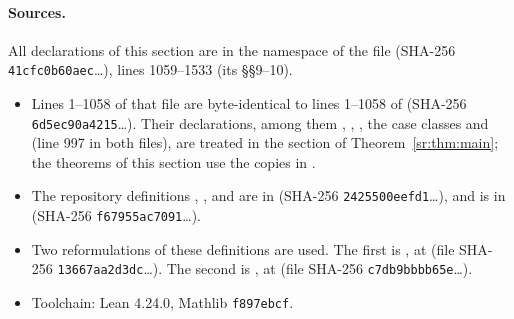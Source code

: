 \paragraph{Sources.}
All declarations of this section are in the namespace  of the file
 (SHA-256 \texttt{41cfc0b60aec}\dots), lines 1059--1533 (its \S\S9--10).
\begin{itemize}
\item Lines 1--1058 of that file are byte-identical to lines 1--1058 of 
(SHA-256 \texttt{6d5ec90a4215}\dots). Their declarations, among them , ,
, the case classes and  (line 997 in both files), are treated in
the section of Theorem~\ref{sr:thm:main}; the theorems of this section use the copies in
.
\item The repository definitions , ,  and 
are in  (SHA-256 \texttt{2425500eefd1}\dots), and  is in
 (SHA-256 \texttt{f67955ac7091}\dots).
\item Two reformulations of these definitions are used. The first is , at
 (file SHA-256 \texttt{13667aa2d3dc}\dots). The second is
, at  (file SHA-256
\texttt{c7db9bbbb65e}\dots).
\item Toolchain: Lean 4.24.0, Mathlib \texttt{f897ebcf}.
\end{itemize}


